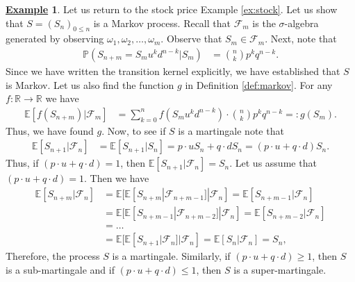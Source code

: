 \documentclass[12pt]{book}
\numberwithin{equation}{chapter}
\theoremstyle{plain}
\numberwithin{theorem}{section}
\theoremstyle{definition}
\newtheorem{example}[theorem]{\underline{Example}}
\numberwithin{exercise}{chapter}
\newcommand{\<}{\langle}
\renewcommand{\>}{\rangle}
\renewcommand{\(}{\left(}
\renewcommand{\)}{\right)}
\renewcommand{\[}{\left[}
\renewcommand{\]}{\right]}
\newcommand\Eb{\mathds{E}}
\newcommand\Pb{\mathds{P}}
\newcommand\Rb{\mathds{R}}
\newcommand\Fc{\mathscr{F}}
\newcommand\om{\omega}
\newcommand\sig{\sigma}
\newcommand{\blu}[1]{\textcolor{blue}{#1}}
\begin{document}
\begin{example}
Let us return to the stock price Example \ref{ex:stock}.  Let us show that $S=(S_n)_{0 \leq n}$ is a Markov process.  Recall that $\Fc_m$ is the $\sig$-algebra generated by observing $\om_1, \om_2, \ldots, \om_m$.
Observe that $S_m \in \Fc_m$.  Next, note that
\begin{align}
\Pb( S_{n+m} = S_m u^k d^{n-k} | S_m )
	&=	\binom{n}{k} p^k q^{n-k} .
\end{align}
Since we have written the transition kernel explicitly, we have established that $S$ is Markov.  Let us also find the function $g$ in Definition \ref{def:markov}.
For any $f:\Rb \to \Rb$ we have
\begin{align}
\Eb[ f(S_{n+m}) | \Fc_m ]
	&=	\sum_{k=0}^n f(S_m u^k d^{n-k}) \cdot \binom{n}{k} p^k q^{n-k}
	=:	g(S_m) . \label{eq:Ef=g}
\end{align}
Thus, we have found $g$.
Now, to see if $S$ is a martingale note that
\begin{align}
\Eb[ S_{n+1} | \Fc_n ]
	&=	\Eb[ S_{n+1} | S_n ]
	=		p \cdot u S_n + q \cdot d S_n
	=		( p \cdot u + q \cdot d ) S_n .
\end{align} 
Thus, if $( p \cdot u + q \cdot d )=1$, then $\Eb[ S_{n+1} | \Fc_n ] = S_n$.  Let us assume that $( p \cdot u + q \cdot d )=1$.  Then we have
\begin{align}
\Eb[S_{n+m}|\Fc_n]
	&=	\Eb[ \Eb[ S_{n+m}|\Fc_{n+m-1}]|\Fc_n]
	=		\Eb[S_{n+m-1}|\Fc_n] \\
	&=	\Eb[ \Eb[ S_{n+m-1}|\Fc_{n+m-2}]|\Fc_n] 
	=		\Eb[S_{n+m-2}|\Fc_n] \\
	&=	\ldots \\
	&=	\Eb[ \Eb[ S_{n+1}|\Fc_{n}]|\Fc_n] 
	=		\Eb[S_{n}|\Fc_n]
	=		S_n ,
\end{align} 
Therefore, the process $S$ is a martingale.  Similarly, if $( p \cdot u + q \cdot d ) \geq 1$, then $S$ is a sub-martingale and if $( p \cdot u + q \cdot d ) \leq 1$, then $S$ is a super-martingale.
\end{example}


\end{document}

